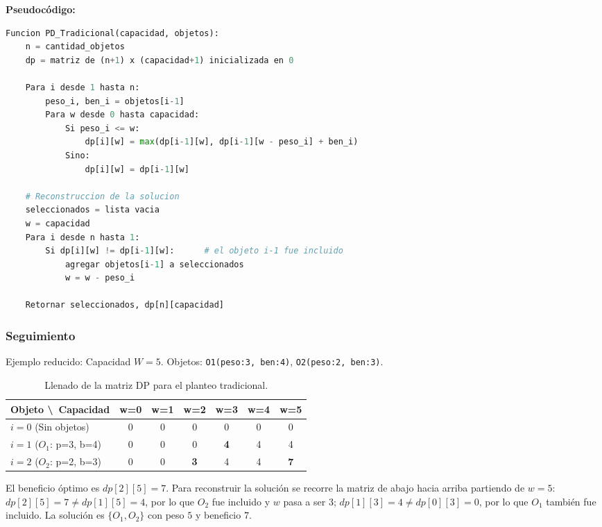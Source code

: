 \documentclass[11pt,a4paper]{article}
\begin{document}
\textbf{Pseudocódigo:}
\begin{lstlisting}[language=Python]
Funcion PD_Tradicional(capacidad, objetos):
    n = cantidad_objetos
    dp = matriz de (n+1) x (capacidad+1) inicializada en 0

    Para i desde 1 hasta n:
        peso_i, ben_i = objetos[i-1]
        Para w desde 0 hasta capacidad:
            Si peso_i <= w:
                dp[i][w] = max(dp[i-1][w], dp[i-1][w - peso_i] + ben_i)
            Sino:
                dp[i][w] = dp[i-1][w]

    # Reconstruccion de la solucion
    seleccionados = lista vacia
    w = capacidad
    Para i desde n hasta 1:
        Si dp[i][w] != dp[i-1][w]:      # el objeto i-1 fue incluido
            agregar objetos[i-1] a seleccionados
            w = w - peso_i

    Retornar seleccionados, dp[n][capacidad]
\end{lstlisting}

\subsubsection{Seguimiento}
Ejemplo reducido: Capacidad $W = 5$. Objetos: \texttt{O1(peso:3, ben:4)}, \texttt{O2(peso:2, ben:3)}.
\begin{table}[h!]
    \centering
    \begin{tabular}{@{}lcccccc@{}}
        \toprule
        \textbf{Objeto \textbackslash \ Capacidad} & \textbf{w=0} & \textbf{w=1} & \textbf{w=2} & \textbf{w=3} & \textbf{w=4} & \textbf{w=5} \\ \midrule
        $i=0$ (Sin objetos) & 0 & 0 & 0 & 0 & 0 & 0 \\
        $i=1$ ($O_1$: p=3, b=4) & 0 & 0 & 0 & \textbf{4} & 4 & 4 \\
        $i=2$ ($O_2$: p=2, b=3) & 0 & 0 & \textbf{3} & 4 & 4 & \textbf{7} \\ \bottomrule
    \end{tabular}
    \caption{Llenado de la matriz DP para el planteo tradicional.}
    \label{tab:pd_trad_seguimiento}
\end{table}
El beneficio óptimo es $dp[2][5] = 7$. Para reconstruir la solución se recorre la matriz de abajo hacia arriba partiendo de $w = 5$: $dp[2][5] = 7 \neq dp[1][5] = 4$, por lo que $O_2$ fue incluido y $w$ pasa a ser $3$; $dp[1][3] = 4 \neq dp[0][3] = 0$, por lo que $O_1$ también fue incluido. La solución es $\{O_1, O_2\}$ con peso $5$ y beneficio $7$.
\end{document}
